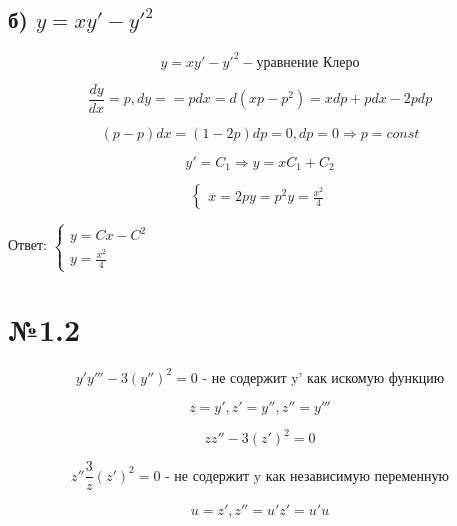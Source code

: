 \documentclass{article}
\begin{document}
\subsection*{б) $ y = xy' - {y'}^2$}

\begin{equation*}
    y = xy' - {y'}^2 - \text{уравнение Клеро}
\end{equation*}

\begin{equation*}
    \frac{dy}{dx} = p , dy = = pdx = d (xp - p^2) = xdp + pdx - 2pdp
\end{equation*}

\begin{equation*}
    (p - p)dx = (1 - 2p)dp = 0, dp = 0 \Rightarrow p = const
\end{equation*}

\begin{equation*}
    y' = C_1 \Rightarrow y = xC_1 + C_2
\end{equation*}

\begin{equation*}
    \begin{cases}
    x = 2p
    y = p^2
    y = \frac{x^2}{4}
    \end{cases}
\end{equation*}

Ответ: $\begin{cases}
y = Cx - C^2 \\
y = \frac{x^2}{4}
\end{cases}$
\section*{№1.2}
\begin{equation*}
    y'y''' - 3 (y'')^2 = 0 \text{ - не содержит y' как искомую функцию}
\end{equation*}

\begin{equation*}
    z = y', z' = y'', z'' = y'''
\end{equation*}

\begin{equation*}
    zz'' - 3(z')^2 = 0
\end{equation*}

\begin{equation*}
    z'' \frac{3}{z}(z')^2 = 0 \text{ - не содержит y как независимую переменную}
\end{equation*}

\begin{equation*}
    u = z', z'' = u'z' = u'u
\end{equation*}
\end{document}
